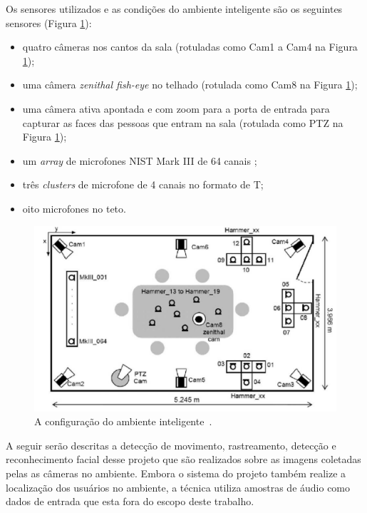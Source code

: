 Os sensores utilizados e as condições do ambiente inteligente são os seguintes sensores (Figura \ref{upc}):

	\begin{itemize}
		\item quatro câmeras nos cantos da sala (rotuladas como Cam1 a Cam4 na Figura \ref{upc});
		\item uma câmera \textit{zenithal fish-eye} no telhado (rotulada como Cam8 na Figura \ref{upc});
		\item uma câmera ativa apontada e com zoom para a porta de entrada para capturar as faces das pessoas que entram na sala (rotulada como PTZ na Figura \ref{upc});
		\item um \textit{array} de microfones NIST Mark III de 64 canais ;
		\item três \textit{clusters} de microfone de 4 canais no formato de T;
		\item oito microfones no teto.
	\end{itemize}

	\begin{figure}[hbt]
		\begin{center}
			\includegraphics[scale=0.4]{figuras/3.TrabalhosCorrelatos/upc.png}
		\end{center}
		\caption{A configuração do ambiente inteligente~\cite{salah}.}
		\label{upc}
	\end{figure}


A seguir serão descritas a detecção de movimento, rastreamento, detecção e reconhecimento facial desse projeto que são realizados sobre as imagens coletadas pelas as câmeras no ambiente. Embora o sistema do projeto também realize a localização dos usuários no ambiente, a técnica utiliza amostras de áudio como dados de entrada que esta fora do escopo deste trabalho.


